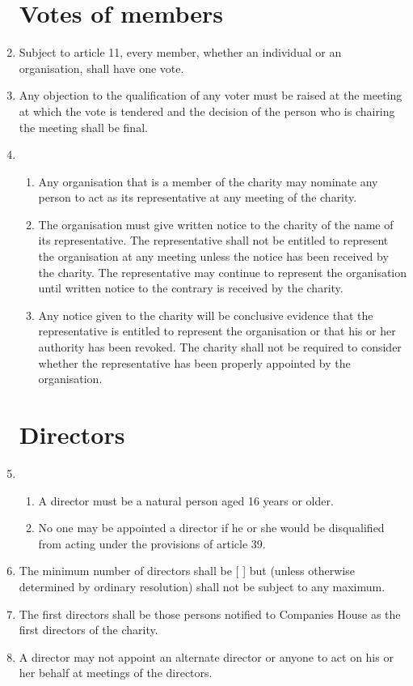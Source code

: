 \documentclass{article}
\begin{document}
\begin{enumerate}[label=\arabic*, start=23]
    \section{Votes of members}
    \item  Subject to article 11, every member, whether an individual or an
    organisation, shall have one vote.
    \item  Any objection to the qualification of any voter must be raised at the
    meeting at which the vote is tendered and the decision of the person
    who is chairing the meeting shall be final.
    \item \begin{enumerate}[label=(\arabic*)]
        \item Any organisation that is a member of the charity may
        nominate any person to act as its representative at any meeting
        of the charity.
        \item  The organisation must give written notice to the charity of the
        name of its representative. The representative shall not be
        entitled to represent the organisation at any meeting unless the
        notice has been received by the charity. The representative may
        continue to represent the organisation until written notice to the
        contrary is received by the charity.
        \item  Any notice given to the charity will be conclusive evidence that
        the representative is entitled to represent the organisation or
        that his or her authority has been revoked. The charity shall not
        be required to consider whether the representative has been
        properly appointed by the organisation.
    \end{enumerate}
    
    \section{Directors}
    \item \begin{enumerate}[label=(\arabic*)]
        \item A director must be a natural person aged 16 years or older.
        \item No one may be appointed a director if he or she would be
        disqualified from acting under the provisions of article 39.
    \end{enumerate}
    \item The minimum number of directors shall be [ ] but (unless
    otherwise determined by ordinary resolution) shall not be subject
    to any maximum.
    \item The first directors shall be those persons notified to Companies House as
    the first directors of the charity.
    \item A director may not appoint an alternate director or anyone to act on his
    or her behalf at meetings of the directors.
    

\end{enumerate}
\end{document}
